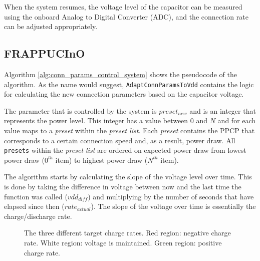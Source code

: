 When the system resumes, the voltage level of the capacitor can be measured using the onboard Analog to Digital Converter (ADC), and the connection rate can be adjusted appropriately. 

\subsection{FRAPPUCInO}
Algorithm \ref{alg:conn_params_control_system} shows the pseudocode of the algorithm. As the name would suggest, \texttt{AdaptConnParamsToVdd} contains the logic for calculating the new connection parameters based on the capacitor voltage. 

The parameter that is controlled by the system is $preset_{new}$ and is an integer that represents the power level. This integer has a value between $0$ and $N$ and for each value maps to a \textit{preset} within the \textit{preset list}. Each \textit{preset} contains the PPCP that corresponds to a certain connection speed and, as a result, power draw. All \texttt{presets} within the \textit{preset list} are ordered on expected power draw from lowest power draw ($0^{th}$ item) to highest power draw ($N^{th}$ item).

The algorithm starts by calculating the slope of the voltage level over time. This is done by taking the difference in voltage between now and the last time the function was called ($vdd_{diff}$) and multiplying by the number of seconds that have elapsed since then ($rate_{actual}$). The slope of the voltage over time is essentially the charge/discharge rate.

\begin{figure}
    \begin{center}
    \end{center}
    \caption{The three different target charge rates. Red region: negative charge rate. White region: voltage is maintained. Green region: positive charge rate.}
    \label{fig:select_charge_rate}
\end{figure}

